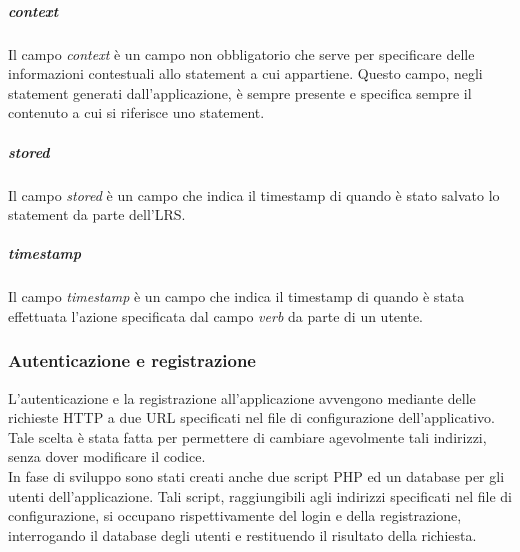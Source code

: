 \documentclass[../Tesi.tex]{subfiles}
\begin{document}
					\subparagraph{context}
					Il campo \textit{context} è un campo non obbligatorio che serve per specificare delle informazioni contestuali allo statement a cui appartiene. Questo campo, negli statement generati dall'applicazione, è sempre presente e specifica sempre il contenuto a cui si riferisce uno statement.

					\subparagraph{stored}
					Il campo \textit{stored} è un campo che indica il timestamp di quando è stato salvato lo statement da parte dell'LRS.

					\subparagraph{timestamp}
					Il campo \textit{timestamp} è un campo che indica il timestamp di quando è stata effettuata l'azione specificata dal campo \textit{verb} da parte di un utente.

			\subsubsection{Autenticazione e registrazione}
			L'autenticazione e la registrazione all'applicazione avvengono mediante delle richieste HTTP a due URL specificati nel file di configurazione dell'applicativo. Tale scelta è stata fatta per permettere di cambiare agevolmente tali indirizzi, senza dover modificare il codice. \\In fase di sviluppo sono stati creati anche due script PHP ed un database per gli utenti dell'applicazione. Tali script, raggiungibili agli indirizzi specificati nel file di configurazione, si occupano rispettivamente del login e della registrazione, interrogando il database degli utenti e restituendo il risultato della richiesta.
\end{document}

